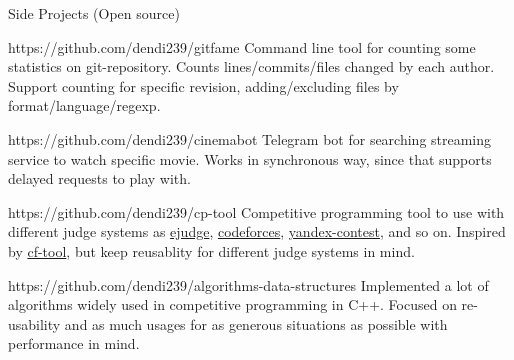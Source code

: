 
\begin{projects}{Side Projects (Open source)}

{https://github.com/dendi239/gitfame}
{Command line tool for counting some statistics on git-repository.
Counts lines/commits/files changed by each author.
Support counting for specific revision, adding/excluding files by format/language/regexp.
}

{https://github.com/dendi239/cinemabot}
{Telegram bot for searching streaming service to watch specific movie.
Works in synchronous way, since that supports delayed requests to play with.
}

{https://github.com/dendi239/cp-tool}
{Competitive programming tool to use with different judge systems as \href{https://ejudge.ru}{ejudge}, \href{https://codeforces.com}{codeforces}, \href{https://contest.yandex.ru}{yandex-contest}, and so on.
Inspired by \href{https://github.com/xalanq/cf-tool}{cf-tool}, but keep reusablity for different judge systems in mind.
}

{https://github.com/dendi239/algorithms-data-structures}
{Implemented a lot of algorithms widely used in competitive programming in C++. Focused on re-usability and as much usages for as generous situations as possible with performance in mind.
}

\end{projects}
